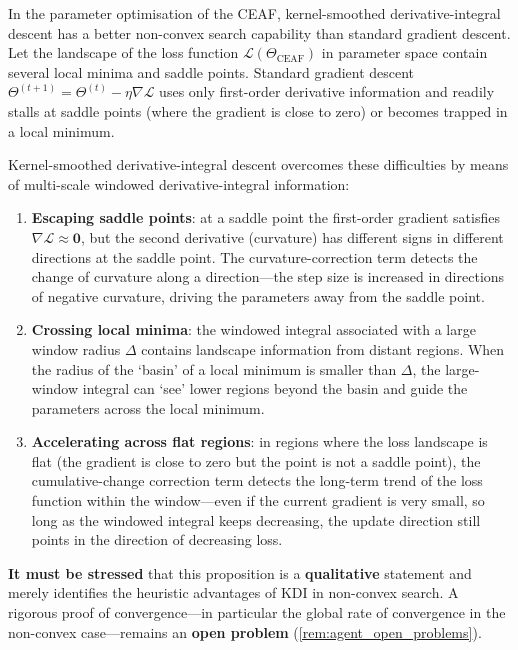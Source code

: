 \begin{proposition}\label{prop:kdi_eaf_convergence}
In the parameter optimisation of the CEAF, kernel-smoothed derivative-integral descent has a better non-convex search capability than standard gradient descent. Let the landscape of the loss function $\mathcal{L}(\Theta_{\text{CEAF}})$ in parameter space contain several local minima and saddle points. Standard gradient descent $\Theta^{(t+1)} = \Theta^{(t)} - \eta \nabla \mathcal{L}$ uses only first-order derivative information and readily stalls at saddle points (where the gradient is close to zero) or becomes trapped in a local minimum.

Kernel-smoothed derivative-integral descent overcomes these difficulties by means of multi-scale windowed derivative-integral information:
\begin{enumerate}[label=(\roman*)]
    \item \textbf{Escaping saddle points}: at a saddle point the first-order gradient satisfies $\nabla \mathcal{L} \approx \mathbf{0}$, but the second derivative (curvature) has different signs in different directions at the saddle point. The curvature-correction term detects the change of curvature along a direction---the step size is increased in directions of negative curvature, driving the parameters away from the saddle point.
    \item \textbf{Crossing local minima}: the windowed integral associated with a large window radius $\Delta$ contains landscape information from distant regions. When the radius of the `basin' of a local minimum is smaller than $\Delta$, the large-window integral can `see' lower regions beyond the basin and guide the parameters across the local minimum.
    \item \textbf{Accelerating across flat regions}: in regions where the loss landscape is flat (the gradient is close to zero but the point is not a saddle point), the cumulative-change correction term detects the long-term trend of the loss function within the window---even if the current gradient is very small, so long as the windowed integral keeps decreasing, the update direction still points in the direction of decreasing loss.
\end{enumerate}

\textbf{It must be stressed} that this proposition is a \textbf{qualitative} statement and merely identifies the heuristic advantages of KDI in non-convex search. A rigorous proof of convergence---in particular the global rate of convergence in the non-convex case---remains an \textbf{open problem} (\cref{rem:agent_open_problems}).
\end{proposition}

